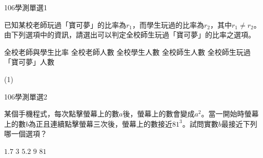 \begin{QUESTIONS}
    \begin{QUESTION}
        \begin{ExamInfo}{106}{學測}{單選}{1}
        \end{ExamInfo}
        \begin{QBODY}
            已知某校老師玩過「寶可夢」的比率為${{r}_{1}}$，而學生玩過的比率為${{r}_{2}}$，其中${{r}_{1}}\ne {{r}_{2}}$。
        由下列選項中的資訊，請選出可以判定全校師生玩過「寶可夢」的比率之選項。
        \begin{QOPS}
            \QOP 全校老師與學生比率     
            \QOP 全校老師人數
            \QOP 全校學生人數
            \QOP 全校師生人數
            \QOP 全校師生玩過「寶可夢」人數
        \end{QOPS}
        \end{QBODY}
        \begin{QFROMS}
        \end{QFROMS}
        \begin{QTAGS}
        \end{QTAGS}
        \begin{QANS}
            (1)
        \end{QANS}
        \begin{QSOL}
        \end{QSOL}
        \begin{QEMPTYSPACE}
        \end{QEMPTYSPACE}
    \end{QUESTION}
    \begin{QUESTION}
        \begin{ExamInfo}{106}{學測}{單選}{2}
        \end{ExamInfo}
        \begin{QBODY}
            某個手機程式，每次點擊螢幕上的數$a$後，螢幕上的數會變成${{a}^{2}}$。當一開始時螢幕上的數$b$為正且連續點擊螢幕三次後，螢幕上的數接近${{81}^{3}}$。試問實數$b$最接近下列哪一個選項？
        \begin{QOPS}
            \QOP $1.7$      
            \QOP $3$      
            \QOP $5.2$      
            \QOP $9$      
            \QOP $81$
        \end{QOPS}
        \end{QBODY}
        \begin{QFROMS}
        \end{QFROMS}
        \begin{QTAGS}

\end{QTAGS}
\end{QUESTION}
\end{QUESTIONS}
